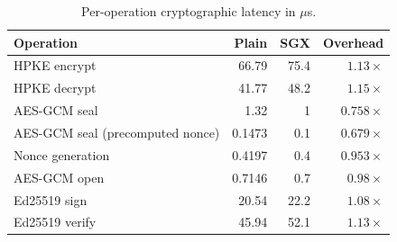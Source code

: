 \begin{table}
\centering
\begin{tabular}{lrrr}
\toprule
Operation & Plain & SGX & Overhead \\
\midrule
HPKE encrypt & 66.79 & 75.4 & $1.13\times$ \\
HPKE decrypt & 41.77 & 48.2 & $1.15\times$ \\
AES-GCM seal & 1.32 & 1 & $0.758\times$ \\
\quad AES-GCM seal (precomputed nonce) & 0.1473 & 0.1 & $0.679\times$ \\
\quad Nonce generation & 0.4197 & 0.4 & $0.953\times$ \\
AES-GCM open & 0.7146 & 0.7 & $0.98\times$ \\
Ed25519 sign & 20.54 & 22.2 & $1.08\times$ \\
Ed25519 verify & 45.94 & 52.1 & $1.13\times$ \\
\bottomrule
\end{tabular}
\caption{Per-operation cryptographic latency in ${}\mu$s.}
\label{tab:reproduction-table4}
\end{table}
